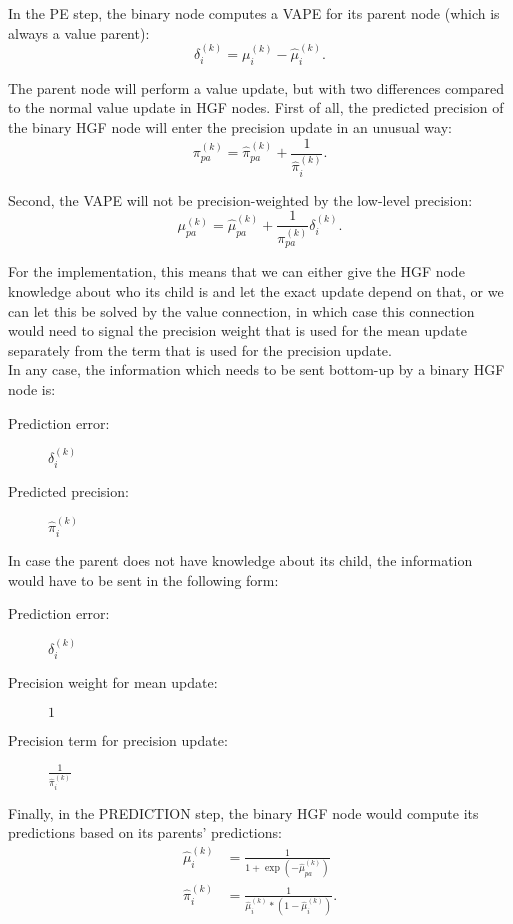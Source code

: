 In the \textsf{PE step}, the binary node computes a \textsf{VAPE} for its parent node (which is always a value parent):
\begin{equation}
    \delta_i^{(k)} = \mu_i^{(k)} - \hat{\mu}_i^{(k)}.
\end{equation}

The parent node will perform a value update, but with two differences compared to the normal value update in HGF nodes. First of all, the predicted precision of the binary HGF node will enter the precision update in an unusual way:
\begin{equation}
    \pi_{pa}^{(k)} = \hat{\pi}_{pa}^{(k)} + \frac{1}{\hat{\pi}_i^{(k)}}.
\end{equation}

Second, the \textsf{VAPE} will not be precision-weighted by the low-level precision:
\begin{equation}
    \mu_{pa}^{(k)} = \hat{\mu}_{pa}^{(k)} + \frac{1}{\pi_{pa}^{(k)}} \delta_i^{(k)}.
\end{equation}

For the implementation, this means that we can either give the HGF node knowledge about who its child is and let the exact update depend on that, or we can let this be solved by the value connection, in which case this connection would need to signal the precision weight that is used for the mean update separately from the term that is used for the precision update.\\

In any case, the information which needs to be sent bottom-up by a binary HGF node is:
\begin{description}
    \item[Prediction error:] $\delta_i^{(k)}$
    \item[Predicted precision:] $\hat{\pi}_i^{(k)}$
\end{description}

In case the parent does not have knowledge about its child, the information would have to be sent in the following form:
\begin{description}
    \item[Prediction error:] $\delta_i^{(k)}$
    \item[Precision weight for mean update:] $1$
    \item[Precision term for precision update:] $\frac{1}{\hat{\pi}_i^{(k)}}$
\end{description}

Finally, in the \textsf{PREDICTION step}, the binary HGF node would compute its predictions based on its parents' predictions:
\begin{align}
    \hat{\mu}_i^{(k)} &= \frac{1}{1 + \exp(-\hat{\mu}_{pa}^{(k)})}\\
    \hat{\pi}_i^{(k)} &= \frac{1}{\hat{\mu}_i^{(k)} * (1- \hat{\mu}_i^{(k)})}.
\end{align}

